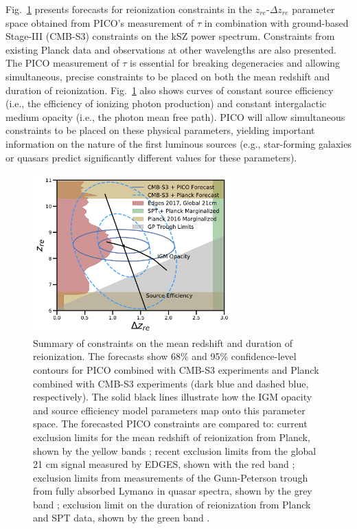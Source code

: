 \documentclass[PICOReport.tex]{subfiles}
\begin{document}
Fig.~\ref{fig:ReionizationPICO} presents forecasts for reionization constraints in the $z_{re}$-$\Delta z_{re}$ parameter space obtained 
from PICO's measurement of $\tau$ in combination with ground-based Stage-III (CMB-S3) constraints on the kSZ power spectrum.  
Constraints from existing Planck data and observations at other wavelengths are also presented.  The PICO measurement of $\tau$ 
is essential for breaking degeneracies  and allowing simultaneous, 
precise constraints to be placed on both the mean redshift and 
duration of reionization.  Fig.~\ref{fig:ReionizationPICO} also shows curves of constant source efficiency (i.e., the efficiency of 
ionizing photon production) and constant intergalactic medium opacity (i.e., the photon mean free path).  PICO will allow 
simultaneous constraints to be placed on these physical parameters, yielding important information on the nature of the 
first luminous sources (e.g., star-forming galaxies or quasars predict significantly different values for these parameters).

\begin{figure}
\hspace{-0.in}
\parbox{3.1in}{\centerline {
\includegraphics[width=3.0in]{images/Reionization_Contours_zbar_delz_PICO_NEW.pdf} } }
\hspace{0.in}
\parbox{3.5in}{
\caption{\label{fig:ReionizationPICO} Summary of constraints on the mean redshift and duration of reionization. The forecasts show 68\% and 95\% confidence-level contours for PICO combined with CMB-S3 experiments and Planck combined with CMB-S3 experiments (dark blue and dashed blue, respectively). The solid black lines illustrate how the IGM opacity and source efficiency model parameters map onto this parameter space. The forecasted PICO constraints are compared to: current exclusion limits for the mean redshift of reionization from Planck, shown by the yellow bands \citealp{planck2018:parameters}; recent exclusion limits from the global 21 cm signal measured by EDGES, shown with the red band \citealp{edges2017}; exclusion limits from measurements of the Gunn-Peterson trough from fully absorbed Lyman$\alpha$ in quasar spectra, shown by the grey band \citealp{Fan2006}; exclusion limit on the duration of reionization from Planck and SPT data, shown by the green band \citealp{planck_reio:2016}.} }
\vspace{-0.1in}
\end{figure}
\end{document}
